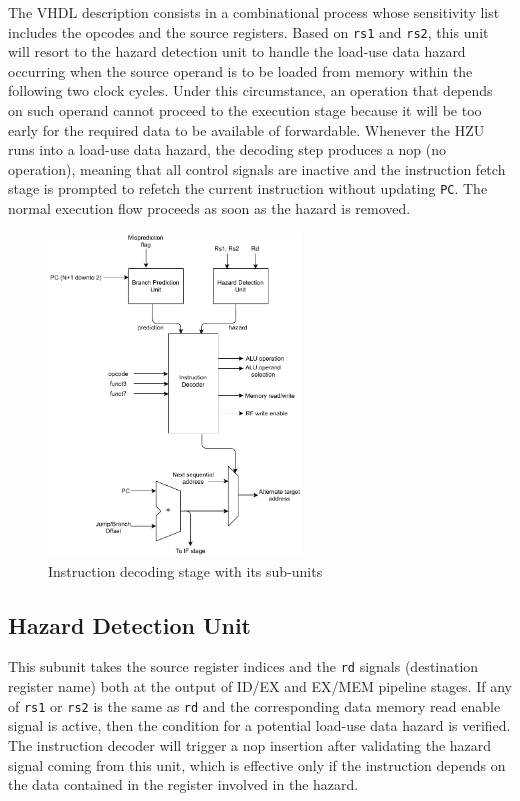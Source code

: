 The VHDL description consists in a combinational process whose sensitivity list includes the opcodes and the source registers. Based on \texttt{rs1} and \texttt{rs2}, this unit will resort to the hazard detection unit to handle the load-use data hazard occurring when the source operand is to be loaded from memory within the following two clock cycles. Under this circumstance, an operation that depends on such operand cannot proceed to the execution stage because it will be too early for the required data to be available of forwardable. Whenever the HZU runs into a load-use data hazard, the decoding step produces a nop (no operation), meaning that all control signals are inactive and the instruction fetch stage is prompted to refetch the current instruction without updating \texttt{PC}. The normal execution flow proceeds as soon as the hazard is removed.

\begin{figure}[h]
	\includegraphics[width=0.6\textwidth]{./images/idstage.pdf}
	\caption{Instruction decoding stage with its sub-units}
	\label{fig:idstage}
\end{figure}

\subsection{Hazard Detection Unit} This subunit takes the source register indices and the \texttt{rd} signals (destination register name) both at the output of ID/EX and EX/MEM pipeline stages. If any of \texttt{rs1} or \texttt{rs2} is the same as \texttt{rd} and the corresponding data memory read enable signal is active, then the condition for a potential load-use data hazard is verified. The instruction decoder will trigger a nop insertion after validating the hazard signal coming from this unit, which is effective only if the instruction depends on the data contained in the register involved in the hazard.


